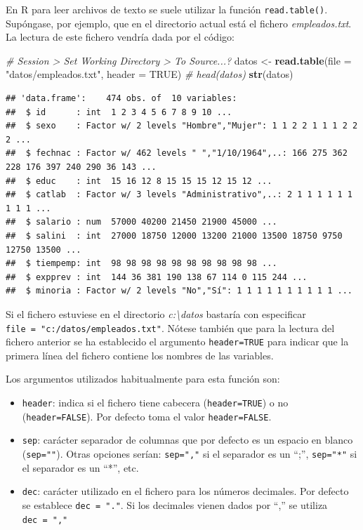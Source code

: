 \documentclass[]{book}
\newenvironment{Shaded}{\begin{snugshade}}{\end{snugshade}}
\newcommand{\KeywordTok}[1]{\textcolor[rgb]{0.13,0.29,0.53}{\textbf{#1}}}
\newcommand{\DataTypeTok}[1]{\textcolor[rgb]{0.13,0.29,0.53}{#1}}
\newcommand{\StringTok}[1]{\textcolor[rgb]{0.31,0.60,0.02}{#1}}
\newcommand{\CommentTok}[1]{\textcolor[rgb]{0.56,0.35,0.01}{\textit{#1}}}
\newcommand{\OtherTok}[1]{\textcolor[rgb]{0.56,0.35,0.01}{#1}}
\newcommand{\NormalTok}[1]{#1}
\begin{document}
En R para leer archivos de texto se suele utilizar la función
\texttt{read.table()}. Supóngase, por ejemplo, que en el directorio
actual está el fichero \emph{empleados.txt}. La lectura de este fichero
vendría dada por el código:

\begin{Shaded}
\begin{Highlighting}[]
\CommentTok{# Session > Set Working Directory > To Source...?}
\NormalTok{datos <-}\StringTok{ }\KeywordTok{read.table}\NormalTok{(}\DataTypeTok{file =} \StringTok{"datos/empleados.txt"}\NormalTok{, }\DataTypeTok{header =} \OtherTok{TRUE}\NormalTok{)}
\CommentTok{# head(datos)}
\KeywordTok{str}\NormalTok{(datos)}
\end{Highlighting}
\end{Shaded}

\begin{verbatim}
## 'data.frame':    474 obs. of  10 variables:
##  $ id      : int  1 2 3 4 5 6 7 8 9 10 ...
##  $ sexo    : Factor w/ 2 levels "Hombre","Mujer": 1 1 2 2 1 1 1 2 2 2 ...
##  $ fechnac : Factor w/ 462 levels " ","1/10/1964",..: 166 275 362 228 176 397 240 290 36 143 ...
##  $ educ    : int  15 16 12 8 15 15 15 12 15 12 ...
##  $ catlab  : Factor w/ 3 levels "Administrativo",..: 2 1 1 1 1 1 1 1 1 1 ...
##  $ salario : num  57000 40200 21450 21900 45000 ...
##  $ salini  : int  27000 18750 12000 13200 21000 13500 18750 9750 12750 13500 ...
##  $ tiempemp: int  98 98 98 98 98 98 98 98 98 98 ...
##  $ expprev : int  144 36 381 190 138 67 114 0 115 244 ...
##  $ minoria : Factor w/ 2 levels "No","Sí": 1 1 1 1 1 1 1 1 1 1 ...
\end{verbatim}

Si el fichero estuviese en el directorio \emph{c:\textbackslash{}datos}
bastaría con especificar \texttt{file\ =\ "c:/datos/empleados.txt"}.
Nótese también que para la lectura del fichero anterior se ha
establecido el argumento \texttt{header=TRUE} para indicar que la
primera línea del fichero contiene los nombres de las variables.

Los argumentos utilizados habitualmente para esta función son:

\begin{itemize}
\item
  \texttt{header}: indica si el fichero tiene cabecera
  (\texttt{header=TRUE}) o no (\texttt{header=FALSE}). Por defecto toma
  el valor \texttt{header=FALSE}.
\item
  \texttt{sep}: carácter separador de columnas que por defecto es un
  espacio en blanco (\texttt{sep=""}). Otras opciones serían:
  \texttt{sep=","} si el separador es un ``;'', \texttt{sep="*"} si el
  separador es un ``*'', etc.
\item
  \texttt{dec}: carácter utilizado en el fichero para los números
  decimales. Por defecto se establece \texttt{dec\ =\ "."}. Si los
  decimales vienen dados por ``,'' se utiliza \texttt{dec\ =\ ","}
\end{itemize}
\end{document}
